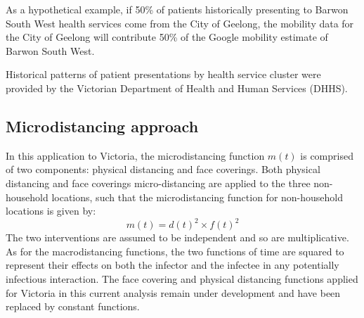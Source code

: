As a hypothetical example, if 50\% of patients historically presenting to Barwon South West health services come from the City of Geelong, the mobility data for the City of Geelong will contribute 50\% of the Google mobility estimate of Barwon South West.

Historical patterns of patient presentations by health service cluster were provided by the Victorian Department of Health and Human Services (DHHS).

\subsection{Microdistancing approach}
In this application to Victoria, the microdistancing function \(m(t)\) is comprised of two components: physical distancing and face coverings. Both physical distancing and face coverings micro-distancing are applied to the three non-household locations, such that the microdistancing function for non-household locations is given by: \[m(t)=d(t)^2\times f(t)^2\]
The two interventions are assumed to be independent and so are multiplicative. As for the macrodistancing functions, the two functions of time are squared to represent their effects on both the infector and the infectee in any potentially infectious interaction.
The face covering and physical distancing functions applied for Victoria in this current analysis remain under development and have been replaced by constant functions.


